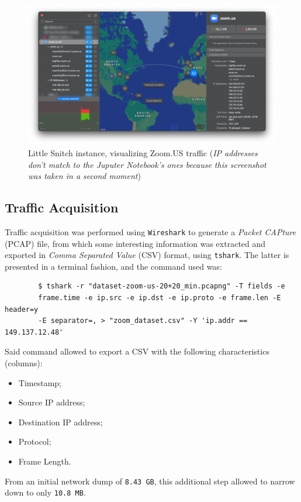 \documentclass{article}
\begin{document}
\begin{figure}[h!]
	\centering
	\includegraphics[width=15cm]{assets/little-snitch.png}
	\caption{Little Snitch instance, visualizing Zoom.US traffic (\textit{IP addresses don't match to the Juputer Notebook's ones because this screenshot was taken in a second moment})}
	\label{fig::little-snitch}
\end{figure}

\subsection{Traffic Acquisition}

Traffic acquisition was performed using \texttt{Wireshark} to generate a \textit{Packet CAPture} (PCAP) file, from which some interesting information was extracted and exported in \textit{Comma Separated Value} (CSV) format, using \texttt{tshark}. The latter is presented in a terminal fashion, and the command used was:

\begin{commandline}
	\begin{verbatim}
		$ tshark -r "dataset-zoom-us-20+20_min.pcapng" -T fields -e 
		frame.time -e ip.src -e ip.dst -e ip.proto -e frame.len -E header=y 
		-E separator=, > "zoom_dataset.csv" -Y 'ip.addr == 149.137.12.48'
	\end{verbatim}
\end{commandline}
Said command allowed to export a CSV with the following characteristics (columns):

\begin{itemize}
	\item Timestamp;
	\item Source IP address;
	\item Destination IP address;
	\item Protocol;
	\item Frame Length.
\end{itemize}
From an initial network dump of \texttt{8.43 GB}, this additional step allowed to narrow down to only \texttt{10.8 MB}.
\end{document}
